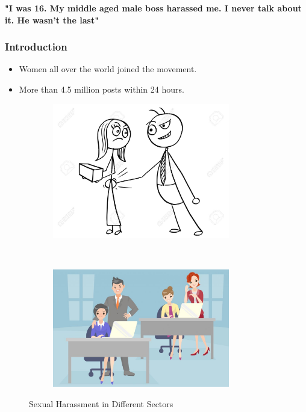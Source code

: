 \documentclass{beamer}
\begin{document}
\begin{frame}
\textbf{\huge "I was 16. My middle aged male boss harassed me. I never talk about it. He wasn't the last"}
\end{frame}
	\begin{frame}
		\frametitle{Introduction}
		\begin{itemize}
			\item {\Large Women all over the world joined the movement.}  \pause
			\newline
			\item {\Large More than 4.5 million posts within 24 hours.}
			
		\end{itemize}
	\end{frame}
\begin{frame}

    	\begin{figure}[h]
    	\centering
    	\begin{subfigure}{0.45\textwidth}
    		\includegraphics[width=0.85\textwidth]{harrasment1.jpg}
    		
    	\end{subfigure} 
    	~
    	\begin{subfigure}{0.45\textwidth}
    		\includegraphics[width=0.85\textwidth]{harassment2.jpg}
    		
    	\end{subfigure}
        \newline
         \newline
    	\caption{Sexual Harassment in Different Sectors}
    \end{figure}
\end{frame}
\end{document}
